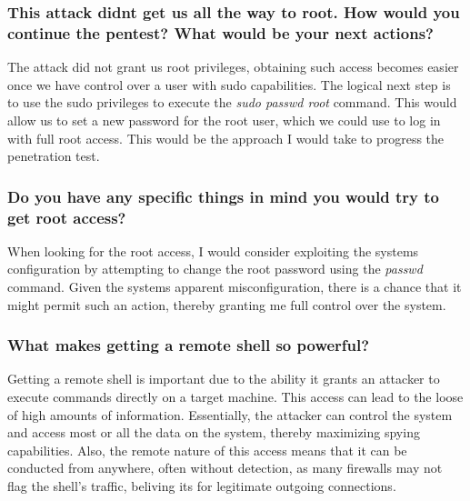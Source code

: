 \subsubsection{This attack didnt get us all the way to root. How would you continue the pentest? What would be your next actions?}
The attack did not grant us root privileges, obtaining such access becomes easier once we have control over a
user with sudo capabilities. The logical next step is to use the sudo privileges to execute the \textit{sudo passwd root} command.
This would allow us to set a new password for the root user, which we could use to log in with full root access.
This would be the approach I would take to progress the penetration test.

\subsubsection{Do you have any specific things in mind you would try to get root access?}
When looking for the root access, I would consider exploiting the systems configuration by attempting to change the root password using the \textit{passwd} command.
Given the systems apparent misconfiguration, there is a chance that it might permit such an action, thereby granting me full control over the system.


\subsubsection{What makes getting a remote shell so powerful?}
Getting a remote shell is important due to the ability it grants an attacker to execute commands directly on a target machine.
This access can lead to the loose of high amounts of information. Essentially, the attacker can control the system and access most or all the data on the system,
thereby maximizing spying capabilities. Also, the remote nature of this access means that it can be conducted from anywhere, often without detection,
as many firewalls may not flag the shell's traffic, beliving its for legitimate outgoing connections.
